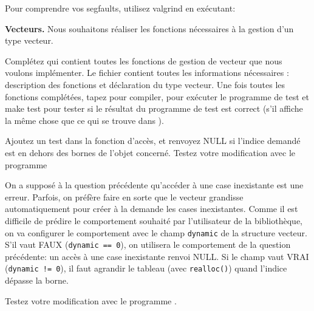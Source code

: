\documentclass[10pt]{article}\usepackage[enonce]{exemptty}
\begin{document}
Pour comprendre vos segfaults, utilisez valgrind en exécutant:

\begin{Exercice} \textbf{Vecteurs.}
  Nous souhaitons réaliser les fonctions nécessaires à la gestion d'un type
  vecteur.

  \Question Complétez  qui contient toutes les
  fonctions de gestion de vecteur que nous voulons implémenter. Le
  fichier  contient toutes les informations
  nécessaires : description des fonctions et déclaration du type
  vecteur. Une fois toutes les fonctions complétées, tapez  pour compiler,  pour exécuter le
  programme de test et make test pour tester si le résultat du
  programme de test est correct (s'il affiche la même chose que ce qui
  se trouve dans ).

  \Question Ajoutez un test dans la fonction d'accès, et renvoyez NULL
  si l'indice demandé est en dehors des bornes de l'objet
  concerné. Testez votre modification avec le programme

  \Question On a supposé à la question précédente qu'accéder à une
  case inexistante est une erreur. Parfois, on préfère faire en sorte
  que le vecteur grandisse automatiquement pour créer à la demande les
  cases inexistantes. Comme il est difficile de prédire le
  comportement souhaité par l'utilisateur de la bibliothèque, on va
  configurer le comportement avec le champ \texttt{dynamic} de la
  structure vecteur. S'il vaut FAUX (\texttt{dynamic == 0}), on
  utilisera le comportement de la question précédente: un accès à une
  case inexistante renvoi NULL. Si le champ vaut VRAI
  (\texttt{dynamic != 0}), il faut agrandir le tableau (avec
  \texttt{realloc()}) quand l'indice dépasse la borne.

  Testez votre modification avec le programme .
\end{Exercice}
\end{document}

